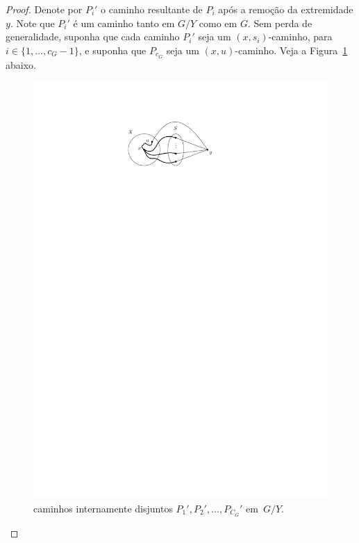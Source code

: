\documentclass[12pt, a4paper]{article}
\theoremstyle{definition}
\begin{document}
\begin{proof}
Denote por $P_i'$ o caminho resultante de $P_i$ após a remoção da extremidade $y$. Note que $P_i'$ é um caminho tanto em $G/Y$ como em $G$. Sem perda de generalidade, suponha que cada caminho $P_i'$ seja um $(x,s_i)$-caminho, para $i \in \{1,\dots,c_G - 1\}$, e suponha que $P_{c_G}$ seja um $(x,u)$-caminho. Veja a Figura~\ref{fig:contract_y} abaixo.
\begin{figure}[H]
  \centering
  \includegraphics{g_contract_y.pdf}
  \caption{caminhos internamente disjuntos $P_1', P_2', \dots, P_{C_G}'$ em~$G/Y$.}
  \label{fig:contract_y}
\end{figure}


\end{proof}
\end{document}
